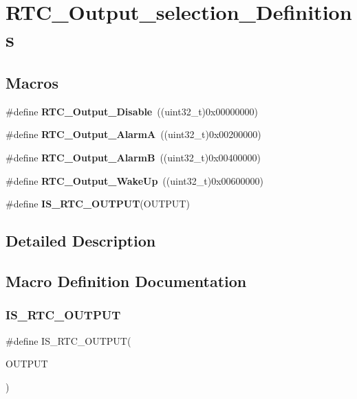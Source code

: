 \section{R\+T\+C\+\_\+\+Output\+\_\+selection\+\_\+\+Definitions}
\label{group__RTC__Output__selection__Definitions}
\subsection*{Macros}
\begin{DoxyCompactItemize}
\item 
\#define \textbf{ R\+T\+C\+\_\+\+Output\+\_\+\+Disable}~((uint32\+\_\+t)0x00000000)
\item 
\#define \textbf{ R\+T\+C\+\_\+\+Output\+\_\+\+AlarmA}~((uint32\+\_\+t)0x00200000)
\item 
\#define \textbf{ R\+T\+C\+\_\+\+Output\+\_\+\+AlarmB}~((uint32\+\_\+t)0x00400000)
\item 
\#define \textbf{ R\+T\+C\+\_\+\+Output\+\_\+\+Wake\+Up}~((uint32\+\_\+t)0x00600000)
\item 
\#define \textbf{ I\+S\+\_\+\+R\+T\+C\+\_\+\+O\+U\+T\+P\+UT}(O\+U\+T\+P\+UT)
\end{DoxyCompactItemize}


\subsection{Detailed Description}


\subsection{Macro Definition Documentation}
\mbox{\label{group__RTC__Output__selection__Definitions_gabc8a868f360abe629c8d8de8b44b3b63}} 
\subsubsection{I\+S\+\_\+\+R\+T\+C\+\_\+\+O\+U\+T\+P\+UT}
{\footnotesize\ttfamily \#define I\+S\+\_\+\+R\+T\+C\+\_\+\+O\+U\+T\+P\+UT(\begin{DoxyParamCaption}\item[{}]{O\+U\+T\+P\+UT }\end{DoxyParamCaption})}

